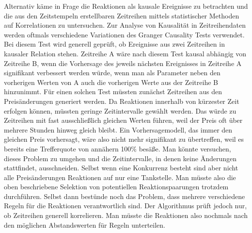 Alternativ käme in Frage die Reaktionen als kausale Ereignisse zu betrachten und die aus den Zeitstempeln erstellbaren Zeitreihen mittels statistischer Methoden auf Korrelationen zu untersuchen. Zur Analyse von Kausalität in Zeitreihendaten werden oftmals verschiedene Variationen des Granger Causality Tests verwendet. Bei diesem Test wird generell geprüft, ob Ereignisse aus zwei Zeitreihen in kausaler Relation stehen. Zeitreihe A wäre nach diesem Test kausal abhängig von Zeitreihe B, wenn die Vorhersage des jeweils nächsten Ereignisses in Zeitreihe A signifikant verbessert werden würde, wenn man als Parameter neben den vorherigen Werten von A auch die vorherigen Werte aus der Zeitreihe B hinzunimmt. Für einen solchen Test müssten zunächst Zeitreihen aus den Preisänderungen generiert werden. Da Reaktionen innerhalb von kürzester Zeit erfolgen können, müssten geringe Zeitintervalle gewählt werden. Das würde zu Zeitreihen mit fast ausschließlich gleichen Werten führen, weil der Preis oft über mehrere Stunden hinweg gleich bleibt. Ein Vorhersagemodell, das immer den gleichen Preis vorhersagt, wäre also nicht mehr signifikant zu übertreffen, weil es bereits eine Trefferquote von annähern 100\% besäße. Man könnte versuchen, dieses Problem zu umgehen und die Zeitintervalle, in denen keine Änderungen stattfindet, ausschneiden. Selbst wenn eine Konkurrenz besteht sind aber nicht alle Preisänderungen Reaktionen auf nur eine Tankstelle. Man müsste also die oben beschriebene Selektion von potentiellen Reaktionspaarungen trotzdem durchführen. Selbst dann bestünde noch das Problem, dass mehrere verschiedene Regeln für die Reaktionen verantwortlich sind. Der Algorithmus prüft jedoch nur, ob Zeitreihen generell korrelieren. Man müsste die Reaktionen also nochmals nach den möglichen Abstandswerten für Regeln unterteilen. \\

